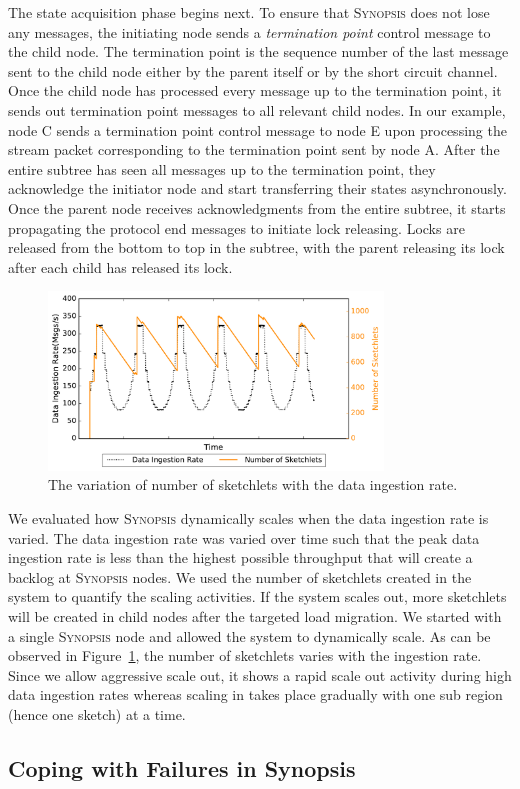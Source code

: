 The state acquisition phase begins next.
To ensure that \textsc{Synopsis} does not lose any messages, the initiating node sends a \emph{termination point} control message to the child node.
The termination point is the sequence number of the last message sent to the child node either by the parent itself or by the short circuit channel.
Once the child node has processed every message up to the termination point, it sends out termination point messages to all relevant child nodes. In our example, node C sends a termination point control message to node E upon processing the stream packet corresponding to the termination point sent by node A.
After the entire subtree has seen all messages up to the termination point, they acknowledge the initiator node and start transferring their states asynchronously.
Once the parent node receives acknowledgments from the entire subtree, it starts propagating the protocol end messages to initiate lock releasing.
Locks are released from the bottom to top in the subtree, with the parent releasing its lock after each child has released its lock.

\begin{figure}
    \centerline{\includegraphics[width=3.5in]{figures/dyn-scaling.pdf}}
    \caption{The variation of number of sketchlets with the data ingestion rate.}
    \label{fig:dyn-scaling}
\end{figure}
We evaluated how \textsc{Synopsis} dynamically scales when the data ingestion rate is varied.
The data ingestion rate was varied over time such that the peak data ingestion rate is less than the highest possible throughput that will create a backlog at \textsc{Synopsis} nodes.
We used the number of sketchlets created in the system to quantify the scaling activities.
If the system scales out, more sketchlets will be created in child nodes after the targeted load migration.
We started with a single \textsc{Synopsis} node and allowed the system to dynamically scale.
As can be observed in Figure~\ref{fig:dyn-scaling}, the number of sketchlets varies with the ingestion rate.
Since we allow aggressive scale out, it shows a rapid scale out activity during high data ingestion rates whereas scaling in takes place gradually with one sub region (hence one sketch) at a time.



\subsection{Coping with Failures in Synopsis}


